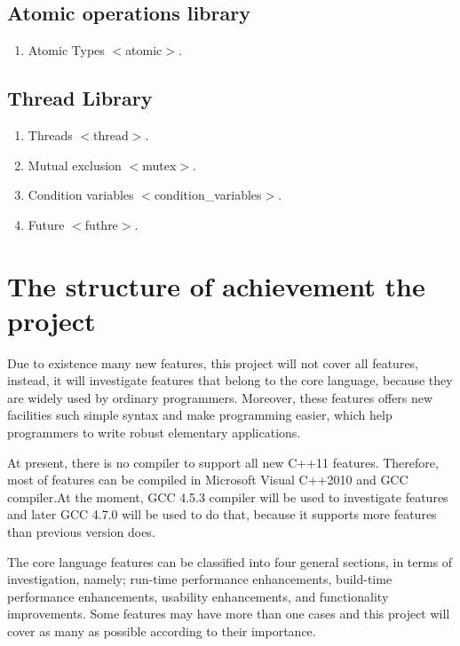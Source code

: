 \documentclass[12pt]{report}
\begin{document}
\subsection{Atomic operations library}
\label{sub-section:	Atomic operations library}
\begin{enumerate}
\item Atomic Types $<$atomic$>$.
\end{enumerate}

\subsection{Thread Library }
\label{sub-section: Thread library }
\begin{enumerate}
\item Threads $<$thread$>$.
\item Mutual exclusion $<$mutex$>$.
\item Condition variables $<$condition\_variables$>$.
\item Future $<$futhre$>$.
\end{enumerate}


\section{The structure of achievement  the project}
\label{section:The structure of achievement  the project}
Due to existence many new features, this project will not cover all features, instead, it will investigate features that belong to the core language, because they are widely used by ordinary programmers.  Moreover, these features offers new facilities such simple syntax and make programming easier, which help programmers to write robust elementary applications.

At present, there is no compiler to support all new C++11 features. Therefore, most of features can be compiled in Microsoft Visual C++2010 and GCC compiler.At the moment,  GCC 4.5.3  compiler will be used to investigate features and later GCC 4.7.0 will be used to do that, because it supports more features than previous version does.

The core language features can be classified into four general sections, in terms of investigation, namely; run-time performance enhancements, build-time performance enhancements, usability enhancements, and functionality improvements. Some features may have more than one cases and this project will cover as many as possible according to their importance.
\end{document}
